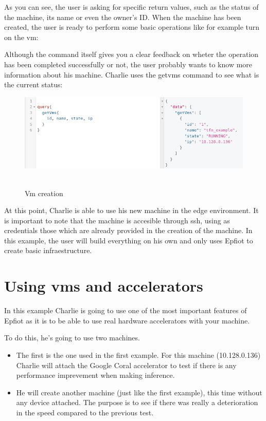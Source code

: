 As you can see, the user is asking for specific return values, such as the status of the machine, its name or even the owner's ID.
When the machine has been created, the user is ready to perform some basic operations like for example turn on the vm:


\noindent{}

Although the command itself gives you a clear feedback on wheter the operation has been completed successfully or not, the user probably wants to know more information about his machine. Charlie uses the getvms command to see what is the current status:

\begin{figure}[h!]%
\centering
    \includegraphics[width=5.5in]{figures/get_vms.png}
~\caption{Vm creation}
\label{figure6.4}
\end{figure}

At this point, Charlie is able to use his new machine in the edge environment.  It is important to note that the machine is accesible through ssh, using as credentials those which are already provided in the creation of the machine. In this example, the user will build everything on his own and only uses Epfiot to create basic infraestructure.

\newpage
\section{Using vms and accelerators}
\label{makereference6.3}

In this example Charlie is going to use one of the most important features of Epfiot as it is to be able to use real hardware accelerators with your machine.

To do this, he's going to use two machines.


\begin{itemize}
    \item The first is the one used in the first example. For this machine (10.128.0.136) Charlie will attach the Google Coral accelerator to test if there is any performance imprevement when making inference.
    \item He will create another machine (just like the first example), this time without any device attached. The purpose is to see if there was really a deterioration in the speed compared to the previous test.
\end{itemize}

